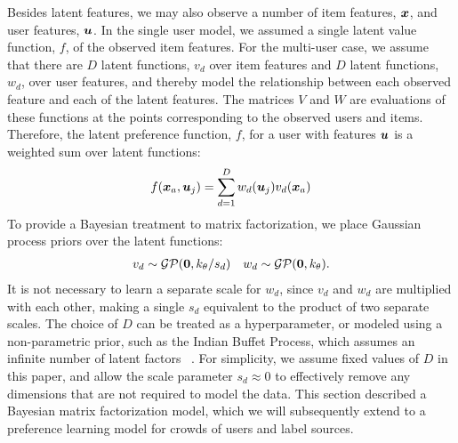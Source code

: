 Besides latent features, we may also observe a number of item features, $\boldsymbol x$,
and user features, $\boldsymbol u$. 
In the single user model, we assumed a single latent value function, $f$, of the observed item features. 
For the multi-user case, we assume that there are $D$ latent functions, $v_d$ over 
item features and $D$ latent functions, $w_d$, over user features,
and thereby model the relationship between each observed feature and each of the latent features. 
The matrices $V$ and $W$ are evaluations of these functions at the points corresponding to 
the observed users and items.
Therefore, the latent preference function, $f$, for a user with features $\boldsymbol u$ is 
a weighted sum over latent functions:
\begin{align}
  f(\boldsymbol x_a, \boldsymbol u_j) = \sum_{d=1}^D w_d(\boldsymbol u_j) v_d(\boldsymbol x_a)
\end{align}
To provide a Bayesian treatment to matrix factorization, we place Gaussian process priors over the latent functions:
\begin{align}
v_d \sim \mathcal{GP}(\boldsymbol 0, k_{\theta} /s_d) & & w_d \sim \mathcal{GP}(\boldsymbol 0, k_{\theta}).
\end{align}
It is not necessary to learn a separate scale for $w_d$, since $v_d$ and $w_d$ are multiplied with each other, making a single $s_d$ equivalent to the product of two separate scales. 
The choice of $D$ can be treated as a hyperparameter, or modeled using a non-parametric prior, such as 
the Indian Buffet Process, which assumes an infinite number of latent factors ~\citep{ding2010nonparametric}.
For simplicity, we assume fixed values of $D$ in this paper, and allow the scale parameter $s_d \approx 0$ 
to effectively remove any dimensions that are not required to model the data.
This section described a Bayesian matrix factorization model, 
which we will subsequently extend to a preference learning model for crowds of users and label sources. 

